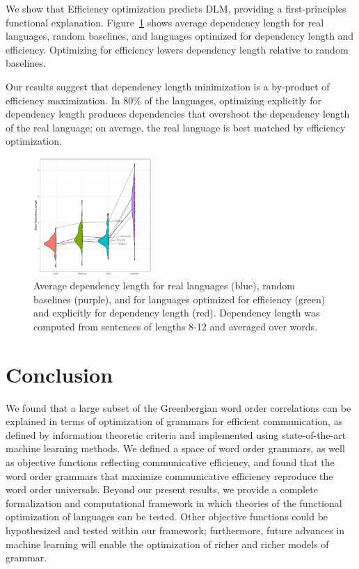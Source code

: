\documentclass[9pt,twocolumn,twoside,lineno]{pnas-new}
\begin{document}
We show that Efficiency optimization predicts DLM, providing a first-principles functional explanation.
Figure~\ref{fig:deplength} shows average dependency length for real languages, random baselines, and languages optimized for dependency length and efficiency.
Optimizing for efficiency lowers dependency length relative to random baselines.

Our results suggest that dependency length minimization is a by-product of efficiency maximization. In 80\% of the languages, optimizing explicitly for dependency length produces dependencies that overshoot the dependency length of the real language; on average, the real language is best matched by efficiency optimization.

\begin{figure} %
\includegraphics[width=0.4\textwidth]{../results/dependency-length/figures/depl-violin.pdf}
	\caption{Average dependency length for real languages (blue), random baselines (purple), and for languages optimized for efficiency (green) and explicitly for dependency length (red). Dependency length was computed from sentences of lengths 8-12 and averaged over words.}\label{fig:deplength}
\end{figure}





\section{Conclusion}

We found that a large subset of the Greenbergian word order correlations can be explained in terms of optimization of grammars for efficient communication, as defined by information theoretic criteria and implemented using state-of-the-art machine learning methods. We defined a space of word order grammars, as well as objective functions reflecting communicative efficiency, and found that the word order grammars that maximize communicative efficiency reproduce the word order universals. Beyond our present results, we provide a complete formalization and computational framework in which theories of the functional optimization of languages can be tested. Other objective functions could be hypothesized and tested within our framework; furthermore, future advances in machine learning will enable the optimization of richer and richer models of grammar.
\end{document}
